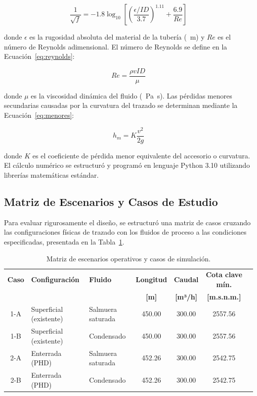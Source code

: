 \begin{equation}
    \frac{1}{\sqrt{f}} = -1.8 \log_{10} \left[ \left( \frac{\epsilon / ID}{3.7} \right)^{1.11} + \frac{6.9}{Re} \right]
    \label{eq:haaland}
\end{equation}

\noindent donde $\epsilon$ es la rugosidad absoluta del material de la tubería (\SI{}{\meter}) y $Re$ es el número de Reynolds adimensional. El número de Reynolds se define en la Ecuación~\ref{eq:reynolds}:

\begin{equation}
    Re = \frac{\rho v ID}{\mu}
    \label{eq:reynolds}
\end{equation}

\noindent donde $\mu$ es la viscosidad dinámica del fluido (\SI{}{\pascal\second}). Las pérdidas menores secundarias causadas por la curvatura del trazado se determinan mediante la Ecuación~\ref{eq:menores}:

\begin{equation}
    h_m = K \frac{v^2}{2g}
    \label{eq:menores}
\end{equation}

\noindent donde $K$ es el coeficiente de pérdida menor equivalente del accesorio o curvatura. El cálculo numérico se estructuró y programó en lenguaje Python 3.10 utilizando librerías matemáticas estándar.

\subsection{Matriz de Escenarios y Casos de Estudio}
\label{ssec:matriz}

Para evaluar rigurosamente el diseño, se estructuró una matriz de casos cruzando las configuraciones físicas de trazado con los fluidos de proceso a las condiciones especificadas, presentada en la Tabla~\ref{tab:escenarios}.

\begin{table}[htbp]
    \centering
    \caption{Matriz de escenarios operativos y casos de simulación.}
    \label{tab:escenarios}
    \small
    \begin{tabularx}{\textwidth}{@{}c>{\raggedright\arraybackslash}X>{\raggedright\arraybackslash}Xcccc@{}}
        \toprule
        \textbf{Caso} & \textbf{Configuración} & \textbf{Fluido} & \textbf{Longitud} & \textbf{Caudal} & \textbf{Cota clave mín.} \\
        & & & \textbf{[m]} & \textbf{[m³/h]} & \textbf{[m.s.n.m.]} \\
        \midrule
        1-A & Superficial (existente) & Salmuera saturada & 450.00 & 300.00 & 2557.56 \\
        1-B & Superficial (existente) & Condensado & 450.00 & 300.00 & 2557.56 \\
        2-A & Enterrada (PHD) & Salmuera saturada & 452.26 & 300.00 & 2542.75 \\
        2-B & Enterrada (PHD) & Condensado & 452.26 & 300.00 & 2542.75 \\
        \bottomrule
    \end{tabularx}
\end{table}
